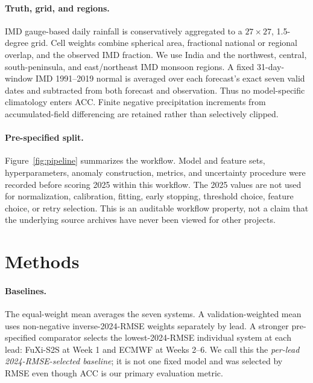 \documentclass[10pt,twocolumn]{article}
\begin{document}
\paragraph{Truth, grid, and regions.}
IMD gauge-based daily rainfall \citep{pai2014imd} is conservatively aggregated
to a $27\times27$, 1.5-degree grid. Cell weights combine spherical area,
fractional national or regional overlap, and the observed IMD fraction. We use
India and the northwest, central, south-peninsula, and east/northeast IMD
monsoon regions. A fixed 31-day-window IMD 1991--2019 normal is averaged over
each forecast's exact seven valid dates and subtracted from both forecast and
observation. Thus no model-specific climatology enters ACC. Finite negative
precipitation increments from accumulated-field differencing are retained
rather than selectively clipped.

\paragraph{Pre-specified split.}
Figure~\ref{fig:pipeline} summarizes the workflow. Model and feature sets,
hyperparameters, anomaly construction, metrics, and uncertainty procedure
were recorded before scoring 2025 within this workflow. The 2025 values are
not used for normalization, calibration, fitting, early stopping, threshold
choice, feature choice, or retry selection. This is an auditable workflow
property, not a claim that the underlying source archives have never been
viewed for other projects.

\section{Methods}

\paragraph{Baselines.}
The equal-weight mean averages the seven systems. A validation-weighted mean
uses non-negative inverse-2024-RMSE weights separately by lead. A stronger
pre-specified comparator selects the lowest-2024-RMSE individual system at
each lead: FuXi-S2S at Week 1 and ECMWF at Weeks 2--6. We call this the
\emph{per-lead 2024-RMSE-selected baseline}; it is not one fixed model and was
selected by RMSE even though ACC is our primary evaluation metric.
\end{document}
